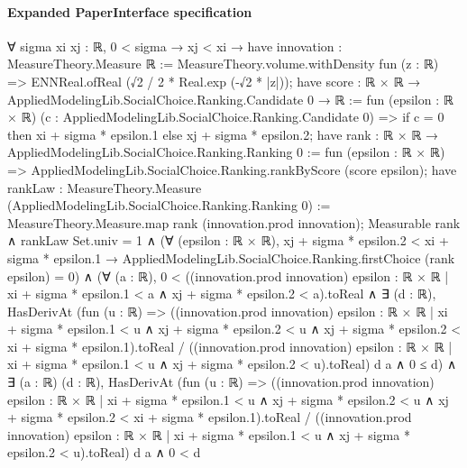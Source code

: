 \documentclass[10pt]{article}
\begin{document}
\paragraph{Expanded PaperInterface specification}
\begin{ReviewVerbatim}
∀ {sigma xi xj : ℝ},
  0 < sigma →
    xj < xi →
      have innovation : MeasureTheory.Measure ℝ :=
        MeasureTheory.volume.withDensity fun (z : ℝ) => ENNReal.ofReal (√2 / 2 * Real.exp (-√2 * |z|));
      have score : ℝ × ℝ → AppliedModelingLib.SocialChoice.Ranking.Candidate 0 → ℝ :=
        fun (epsilon : ℝ × ℝ) (c : AppliedModelingLib.SocialChoice.Ranking.Candidate 0) =>
        if c = 0 then xi + sigma * epsilon.1 else xj + sigma * epsilon.2;
      have rank : ℝ × ℝ → AppliedModelingLib.SocialChoice.Ranking.Ranking 0 := fun (epsilon : ℝ × ℝ) =>
        AppliedModelingLib.SocialChoice.Ranking.rankByScore (score epsilon);
      have rankLaw : MeasureTheory.Measure (AppliedModelingLib.SocialChoice.Ranking.Ranking 0) :=
        MeasureTheory.Measure.map rank (innovation.prod innovation);
      Measurable rank ∧
        rankLaw Set.univ = 1 ∧
          (∀ (epsilon : ℝ × ℝ),
              xj + sigma * epsilon.2 < xi + sigma * epsilon.1 →
                AppliedModelingLib.SocialChoice.Ranking.firstChoice (rank epsilon) = 0) ∧
            (∀ (a : ℝ),
                0 <
                    ((innovation.prod innovation)
                        {epsilon : ℝ × ℝ | xi + sigma * epsilon.1 < a ∧ xj + sigma * epsilon.2 < a}).toReal ∧
                  ∃ (d : ℝ),
                    HasDerivAt
                        (fun (u : ℝ) =>
                          ((innovation.prod innovation)
                                {epsilon : ℝ × ℝ |
                                  xi + sigma * epsilon.1 < u ∧
                                    xj + sigma * epsilon.2 < u ∧
                                      xj + sigma * epsilon.2 < xi + sigma * epsilon.1}).toReal /
                            ((innovation.prod innovation)
                                {epsilon : ℝ × ℝ | xi + sigma * epsilon.1 < u ∧ xj + sigma * epsilon.2 < u}).toReal)
                        d a ∧
                      0 ≤ d) ∧
              ∃ (a : ℝ) (d : ℝ),
                HasDerivAt
                    (fun (u : ℝ) =>
                      ((innovation.prod innovation)
                            {epsilon : ℝ × ℝ |
                              xi + sigma * epsilon.1 < u ∧
                                xj + sigma * epsilon.2 < u ∧ xj + sigma * epsilon.2 < xi + sigma * epsilon.1}).toReal /
                        ((innovation.prod innovation)
                            {epsilon : ℝ × ℝ | xi + sigma * epsilon.1 < u ∧ xj + sigma * epsilon.2 < u}).toReal)
                    d a ∧
                  0 < d
\end{ReviewVerbatim}
\end{document}
